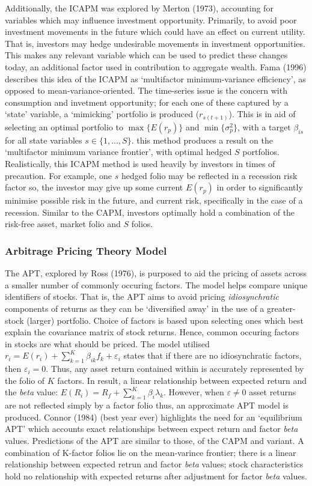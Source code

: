 \documentclass[11pt, english]{article}
\begin{document}
        Additionally, the ICAPM was explored by Merton (1973), accounting for variables which may influence investment opportunity. Primarily, to avoid poor investment movements in the future which could have an effect on current utility. That is, investors may hedge undesirable movements in investment opportunities. This makes any relevant variable which can be used to predict these changes today, an additional factor used in contribution to aggregate wealth. Fama (1996) describes this idea of the ICAPM as `multifactor minimum-variance efficiency', as opposed to mean-variance-oriented. The time-series issue is the concern with consumption and invetment opportunity; for each one of these captured by a `state' variable, a `mimicking' portfolio is produced ($r_{s(t+1)}$). This is in aid of selecting an optimal portfolio to $\max\{E(r_p)\}$ and $\min\{\sigma_p^2\}$, with a target $\beta_{is}$ for all state variables $s\in\{1,...,S\}$. this method produces a result on the `multifactor minimum variance frontier', with optimal hedged $S$ portfolios. Realistically, this ICAPM method is used heavily by investors in times of precaution. For example, one $s$ hedged folio may be reflected in a recession risk factor so, the investor may give up some current $E(r_p)$ in order to significantly minimise possible risk in the future, and current risk, specifically in the case of a recession. Similar to the CAPM, investors optimally hold a combination of the risk-free asset, market folio and $S$ folios.

		\subsubsection*{Arbitrage Pricing Theory Model}

	The APT, explored by Ross (1976), is purposed to aid the pricing of assets across a smaller number of commonly occuring factors. The model helps compare unique identifiers of stocks. That is, the APT aims to avoid pricing \textit{idiosynchratic} components of returns as they can be `diversified away' in the use of a greater-stock (larger) portfolio. Choice of factors is based upon selecting ones which best explain the covariance matrix of stock returns. Hence, common occuring factors in stocks are what should be priced. The model utilised $r_i=E(r_i)+\sum_{k=1}^K\beta_{ik}f_k+\varepsilon_i$ states that if there are no idiosynchratic factors, then $\varepsilon_i=0$. Thus, any asset return contained within is accurately represented by the folio of $K$ factors. In result, a linear relationship between expected return and the \textit{beta} value: $E(R_i)=R_f+\sum_{k=1}^K\beta_i\lambda_k$. However, when $\varepsilon\neq0$ asset returns are not reflected simply by a factor folio thus, an approximate APT model is produced. Connor (1984) (best year ever) highlights the need for an `equilibrium APT' which accounts exact relationships between expect return and factor \textit{beta} values. Predictions of the APT are similar to those, of the CAPM and variant. A combination of K-factor folios lie on the mean-varince frontier; there is a linear relationship between expected retrun and factor \textit{beta} values; stock characteristics hold no relationship with expected returns after adjustment for factor \textit{beta} values.
\end{document}
